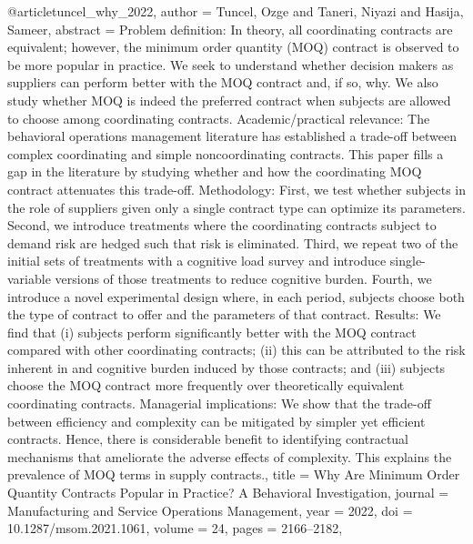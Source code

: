 @article{tuncel_why_2022,
  author = {Tuncel, Ozge and Taneri, Niyazi and Hasija, Sameer},
  abstract = {Problem definition: In theory, all coordinating contracts are equivalent; however, the minimum order quantity (MOQ) contract is observed to be more popular in practice. We seek to understand whether decision makers as suppliers can perform better with the MOQ contract and, if so, why. We also study whether MOQ is indeed the preferred contract when subjects are allowed to choose among coordinating contracts. Academic/practical relevance: The behavioral operations management literature has established a trade-off between complex coordinating and simple noncoordinating contracts. This paper fills a gap in the literature by studying whether and how the coordinating MOQ contract attenuates this trade-off. Methodology: First, we test whether subjects in the role of suppliers given only a single contract type can optimize its parameters. Second, we introduce treatments where the coordinating contracts subject to demand risk are hedged such that risk is eliminated. Third, we repeat two of the initial sets of treatments with a cognitive load survey and introduce single-variable versions of those treatments to reduce cognitive burden. Fourth, we introduce a novel experimental design where, in each period, subjects choose both the type of contract to offer and the parameters of that contract. Results: We find that (i) subjects perform significantly better with the MOQ contract compared with other coordinating contracts; (ii) this can be attributed to the risk inherent in and cognitive burden induced by those contracts; and (iii) subjects choose the MOQ contract more frequently over theoretically equivalent coordinating contracts. Managerial implications: We show that the trade-off between efficiency and complexity can be mitigated by simpler yet efficient contracts. Hence, there is considerable benefit to identifying contractual mechanisms that ameliorate the adverse effects of complexity. This explains the prevalence of MOQ terms in supply contracts.},
  title = {{Why} {Are} {Minimum} {Order} {Quantity} {Contracts} {Popular} {in} {Practice}? {A} {Behavioral} {Investigation}},
  journal = {Manufacturing and Service Operations Management},
  year = {2022},
  doi = {10.1287/msom.2021.1061},
  volume = {24},
  pages = {2166--2182},
}

